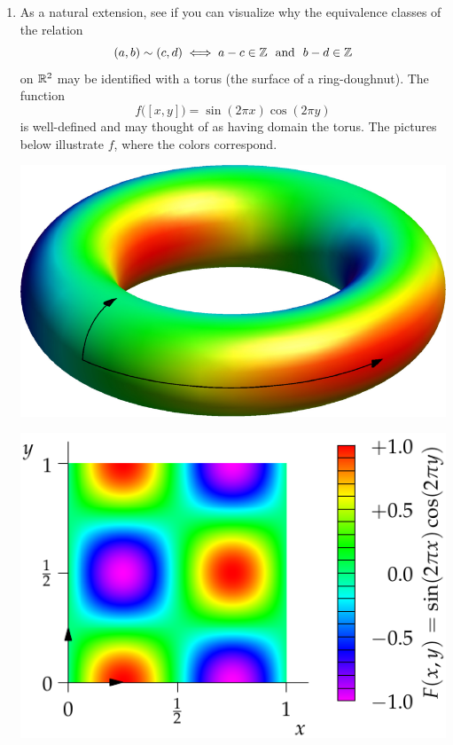 \begin{examples}{}{}
\begin{enumerate}
	  \item As a natural extension, see if you can visualize why the equivalence classes of the relation
	  \[
			(a,b)\sim (c,d)\iff a-c\in\Z \ \text{ and }\ b-d\in\Z
		\]
		on $\mathbb{R}^2$ may be identified with a torus (the surface of a ring-doughnut). The function
		\[
			f\bigl([x,y]\bigr) =\sin(2\pi x)\cos(2\pi y)
		\]
		is well-defined and may thought of as having domain the torus. The pictures below illustrate $f$, where the colors correspond.\par
		\begin{minipage}[t]{0.49\linewidth}\vspace{-5pt}
			\centering
			\includegraphics[scale=0.9]{relations-14-torus}
		\end{minipage}
		\hfill
		\begin{minipage}[t]{0.49\linewidth}\vspace{-22pt}
			\centering
			\includegraphics[scale=0.7]{relations-14-torus2}
		\end{minipage}
	\end{enumerate}
\end{examples}

